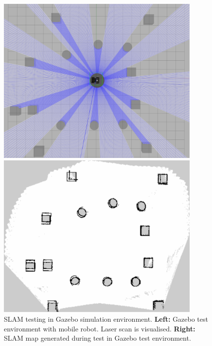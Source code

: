 \begin{figure}[htp!]
  \centering
  \begin{minipage}[b]{0.49\textwidth}
        \centering
        \includegraphics[width = 0.9\textwidth]{Figures/figMapGazeboSim2.pdf}
  \end{minipage}
  \hfill
  \begin{minipage}[b]{0.49\textwidth}
    \centering
    \includegraphics[width = 0.9\textwidth]{Figures/figMapSim.pdf}
  \end{minipage}
  \caption{SLAM testing in Gazebo simulation environment. \textbf{Left:} Gazebo test environment with mobile robot. Laser scan is visualised. \textbf{Right:} SLAM map generated during test in Gazebo test environment.}
  \label{fig:R:H:SLAM:figSLAMSim}
\end{figure}

